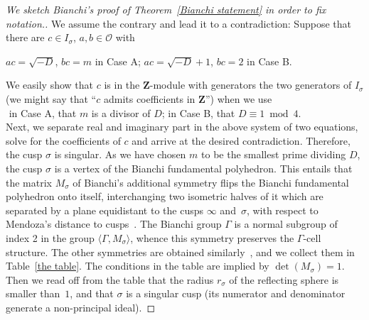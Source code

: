\documentclass[twoside,a4paper,12 pt]{amsart}
\newcommand{\ringO}{\mathcal{O}}
\newcommand{\Z}{{\mathbf{Z}}}
\theoremstyle{plain}
\theoremstyle{definition}
\theoremstyle{remark}
\begin{document}
\begin{proof}[We sketch Bianchi's proof of Theorem~\ref{Bianchi statement} in order to fix notation.]
We assume the contrary and lead it to a contradiction:
Suppose that there are $c \in I_\sigma$, $a, b \in \ringO$ with 
\begin{center}
\hfill $a c = \sqrt{-D}$, $b c = m$  in Case A;
\hfill
$a c = \sqrt{-D}+1$, $b c = 2$ in Case B. \hfill ${}$ 
\end{center}
We easily show that $c$ is in the $\Z$-module with generators the two generators of $I_\sigma$
(we might say that ``$c$ admits coefficients in $\Z$'') when we use 
\\${}$ \hfill in Case A, that $m$ is a divisor of $D$; \hfill in Case B, that $D \equiv 1 \bmod 4$. \hfill ${}$ \\
Next, we separate real and imaginary part in the above system of two equations, solve for the coefficients of $c$ 
and arrive at the desired contradiction.
Therefore, the cusp $\sigma$ is singular. 
As we have chosen $m$ to be the smallest prime dividing $D$,
the cusp $\sigma$ is a vertex of the Bianchi fundamental polyhedron.
This entails that the matrix $M_\sigma$ 
of Bianchi's additional symmetry flips the Bianchi fundamental polyhedron onto itself,
interchanging two isometric halves of it which are separated by a plane equidistant to the cusps $\infty$ and~$\sigma$,
with respect to Mendoza's distance to cusps~\cite{Mendoza}.
The Bianchi group $\Gamma$ is a normal subgroup of index 2 in the group $\langle \Gamma, M_\sigma \rangle$,
whence this symmetry preserves the $\Gamma$-cell structure.
The other symmetries are obtained similarly~\cite{Bianchi1893}, and we collect them in Table~\ref{the table}.
The conditions in the table are implied by $\det(M_\sigma) = 1$.
Then we read off from the table that the radius $r_\sigma$ of the reflecting sphere is smaller than~$1$, and that $\sigma$ is a singular cusp (its numerator and denominator generate a non-principal ideal).

\end{proof}
\end{document}
